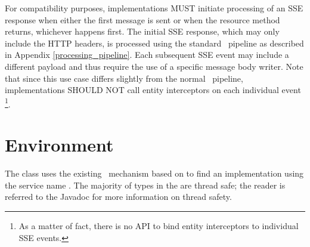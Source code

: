 For compatibility purposes, implementations MUST initiate processing of an SSE response when either the first message is sent or when the resource method returns, whichever happens first. The initial SSE response, which may only include the HTTP headers, is processed using the standard \jaxrs\ pipeline as described in Appendix \ref{processing_pipeline}. Each subsequent SSE event may include a different payload and thus require the use of a specific message body writer. Note that since this use case differs slightly from the normal \jaxrs\ pipeline, implementations SHOULD NOT call entity interceptors on each individual event \footnote{As a matter of fact, there is no API to bind entity interceptors to individual SSE events.}.

\section{Environment}
\label{sse_environment}

The  class uses the existing \jaxrs\ mechanism based on  to find an implementation using the service name . The majority of types in the  are thread safe; the reader is referred to the Javadoc for more information on thread safety.


